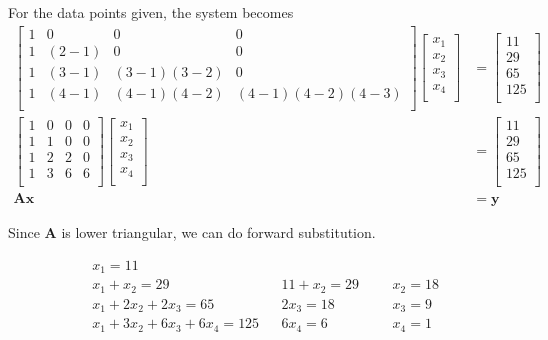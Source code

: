 For the data points given, the system becomes
\begin{align*}
\begin{bmatrix}
1 & 0 & 0 & 0 \\
1 & (2-1) & 0 & 0 \\
1 & (3-1) & (3-1)(3-2) & 0 \\
1 & (4-1) & (4-1)(4-2) & (4-1)(4-2)(4-3) \\
\end{bmatrix}
\begin{bmatrix}
x_1 \\
x_2 \\
x_3 \\
x_4 \\
\end{bmatrix}
&=
\begin{bmatrix}
11 \\
29 \\
65 \\
125 \\
\end{bmatrix}\\
\begin{bmatrix}
1 & 0 & 0 & 0 \\
1 & 1 & 0 & 0 \\
1 & 2 & 2 & 0 \\
1 & 3 & 6 & 6 \\
\end{bmatrix}
\begin{bmatrix}
x_1 \\
x_2 \\
x_3 \\
x_4 \\
\end{bmatrix}
&=
\begin{bmatrix}
11 \\
29 \\
65 \\
125 \\
\end{bmatrix}\\
\mathbf{Ax} &= \mathbf{y}
\end{align*}

Since $\mathbf{A}$ is lower triangular, we can do forward substitution.

\begin{align*}
&x_1 = 11\\
&x_1 + x_2 = 29 && 11 + x_2 = 29 &&&x_2 = 18\\
&x_1 + 2x_2 + 2x_3 = 65 && 2x_3 = 18 &&&x_3 = 9\\ 
&x_1 + 3x_2 + 6x_3 + 6x_4 = 125 && 6x_4 = 6 &&&x_4=1\\
\end{align*}

